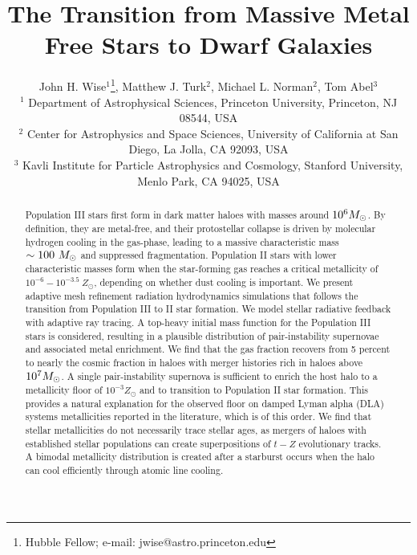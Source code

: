 \documentclass[useAMS,usenatbib]{mn2e}
\begin{document}
\title[Transition from Pop III to Dwarf Galaxies]{The Transition from
  Massive Metal Free Stars to Dwarf Galaxies}

\author[J. H. Wise et al.]{John H. Wise$^1$\thanks{Hubble Fellow;
    e-mail: jwise@astro.princeton.edu}, Matthew J. Turk$^2$, Michael
  L. Norman$^2$, Tom Abel$^3$\\
  $^{1}$ Department of Astrophysical Sciences, Princeton University,
  Princeton, NJ 08544, USA\\
  $^{2}$ Center for Astrophysics and Space Sciences,
  University of California at San Diego, La Jolla, CA 92093, USA\\
  $^{3}$ Kavli Institute for Particle Astrophysics and Cosmology,
  Stanford University, Menlo Park, CA 94025, USA}

\pagerange{\pageref{firstpage}--\pageref{lastpage}} 

\maketitle
\label{firstpage}

\begin{abstract}

  Population III stars first form in dark matter haloes with masses
  around $10^6 \Ms$.  By definition, they are metal-free, and their
  protostellar collapse is driven by molecular hydrogen cooling in the
  gas-phase, leading to a massive characteristic mass $\sim 100~\Ms$
  and suppressed fragmentation.  Population II stars with lower
  characteristic masses form when the star-forming gas reaches a
  critical metallicity of $10^{-6} - 10^{-3.5}~Z_\odot$, depending on
  whether dust cooling is important.  We present adaptive mesh
  refinement radiation hydrodynamics simulations that follows the
  transition from Population III to II star formation.  We model
  stellar radiative feedback with adaptive ray tracing.  A top-heavy
  initial mass function for the Population III stars is considered,
  resulting in a plausible distribution of pair-instability supernovae
  and associated metal enrichment.  We find that the gas fraction
  recovers from 5 percent to nearly the cosmic fraction in haloes with
  merger histories rich in haloes above $10^7 \Ms$.  A single
  pair-instability supernova is sufficient to enrich the host halo to
  a metallicity floor of $10^{-3} Z_\odot$ and to transition to
  Population II star formation.  This provides a natural explanation
  for the observed floor on damped Lyman alpha (DLA) systems
  metallicities reported in the literature, which is of this order.
  We find that stellar metallicities do not necessarily trace stellar
  ages, as mergers of haloes with established stellar populations can
  create superpositions of $t-Z$ evolutionary tracks.  A bimodal
  metallicity distribution is created after a starburst occurs when
  the halo can cool efficiently through atomic line cooling.

\end{abstract}
\end{document}
